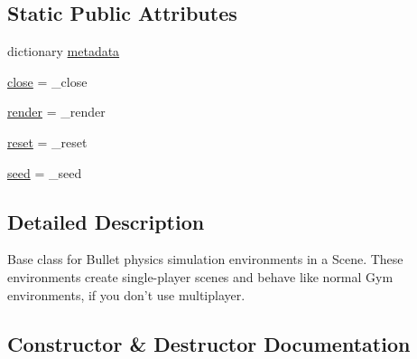 \subsection*{Static Public Attributes}
\begin{DoxyCompactItemize}
\item 
dictionary \hyperlink{classpybullet-gym_1_1pybulletgym_1_1envs_1_1mujoco_1_1envs_1_1env__bases_1_1_base_bullet_env_a54d06c5fded34dda99dbe8d55b392e67}{metadata}
\item 
\hyperlink{classpybullet-gym_1_1pybulletgym_1_1envs_1_1mujoco_1_1envs_1_1env__bases_1_1_base_bullet_env_a8fd9c33c8e3690a2f039245928fee7e5}{close} = \+\_\+close
\item 
\hyperlink{classpybullet-gym_1_1pybulletgym_1_1envs_1_1mujoco_1_1envs_1_1env__bases_1_1_base_bullet_env_a0f2431bf012811bd8d2d51d774bf70cb}{render} = \+\_\+render
\item 
\hyperlink{classpybullet-gym_1_1pybulletgym_1_1envs_1_1mujoco_1_1envs_1_1env__bases_1_1_base_bullet_env_a156d25fb2901911d51d80847af5f37e6}{reset} = \+\_\+reset
\item 
\hyperlink{classpybullet-gym_1_1pybulletgym_1_1envs_1_1mujoco_1_1envs_1_1env__bases_1_1_base_bullet_env_a01f3ab5479b65ce8f420b0625fed0781}{seed} = \+\_\+seed
\end{DoxyCompactItemize}


\subsection{Detailed Description}
\begin{DoxyVerb}Base class for Bullet physics simulation environments in a Scene.
These environments create single-player scenes and behave like normal Gym environments, if
you don't use multiplayer.
\end{DoxyVerb}
 

\subsection{Constructor \& Destructor Documentation}
